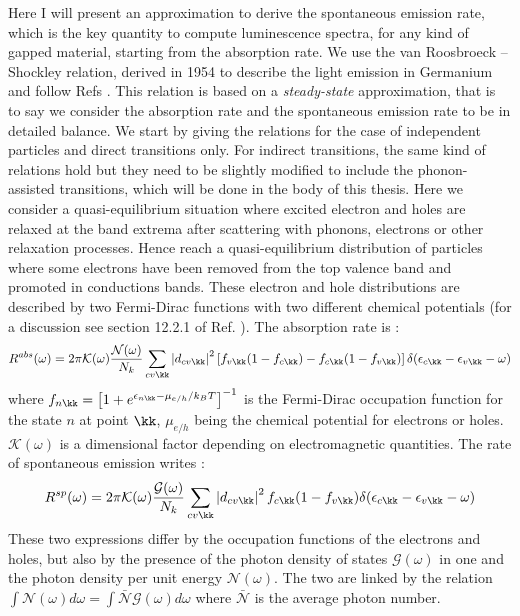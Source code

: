 Here I will present an approximation to derive the spontaneous emission rate, which is the key quantity to compute luminescence spectra, for any kind of gapped material, starting from the absorption rate. We use the van Roosbroeck -- Shockley relation, derived in 1954 to describe the light emission in Germanium \cite{van1954photon} and follow Refs \cite{paleari2019exciton,paleari2019first,}. This relation is based on a \emph{steady-state} approximation, that is to say we consider the absorption rate and the spontaneous emission rate to be in detailed balance. We start by giving the relations for the case of independent particles and direct transitions only. For indirect transitions, the same kind of relations hold but they need to be slightly modified to include the phonon-assisted transitions, which will be done in the body of this thesis. Here we consider a quasi-equilibrium situation
where excited electron and holes are relaxed at the band extrema after scattering with phonons, electrons or other relaxation processes. Hence reach a quasi-equilibrium distribution of particles where some electrons
have been removed from the top valence band and promoted in conductions bands. These electron and hole distributions are described by two Fermi-Dirac functions with two different chemical potentials (for a discussion see section 12.2.1 of Ref. \cite{schafer2002semiconductor}). The absorption rate is :
\begin{equation}
	R^{abs}(\omega) = 2\pi \mathcal{K}(\omega) \frac{\mathcal{N} (\omega)}{N_k} \sum_{cv\kk} \left|d_{cv\kk} \right|^2 \left[ f_{v\kk}(1-f_{c\kk}) - f_{c\kk}(1-f_{v\kk})\right] \delta(\epsilon_{c\kk} - \epsilon_{v\kk} - \omega)
\end{equation}
where $f_{n\kk} = \left[ 1 + e^{\epsilon_{n\kk} - \mu_{e/h}/k_BT} \right]^{-1}$ is the Fermi-Dirac occupation function for the state $n$ at point $\kk$, $\mu_{e/h}$ being the chemical potential for electrons or holes. $\mathcal{K}(\omega)$ is a dimensional factor depending on electromagnetic quantities. The rate of spontaneous emission writes : 
\begin{equation}
	R^{sp}(\omega) = 2\pi \mathcal{K}(\omega) \frac{\mathcal{G} (\omega)}{N_k} \sum_{cv\kk} \left|d_{cv\kk} \right|^2 f_{c\kk}(1-f_{v\kk}) \delta(\epsilon_{c\kk} - \epsilon_{v\kk} - \omega)
\end{equation}
These two expressions differ by the occupation functions of the electrons and holes, but also by the presence of the photon density of states $\mathcal{G}(\omega)$ in one and the photon density per unit energy $\mathcal{N}(\omega)$. The two are linked by the relation $ \int\mathcal{N}(\omega) d\omega = \int \bar{\mathcal{N}} \mathcal{G}(\omega) d\omega$ where $\bar{\mathcal{N}}$ is the average photon number. \\
